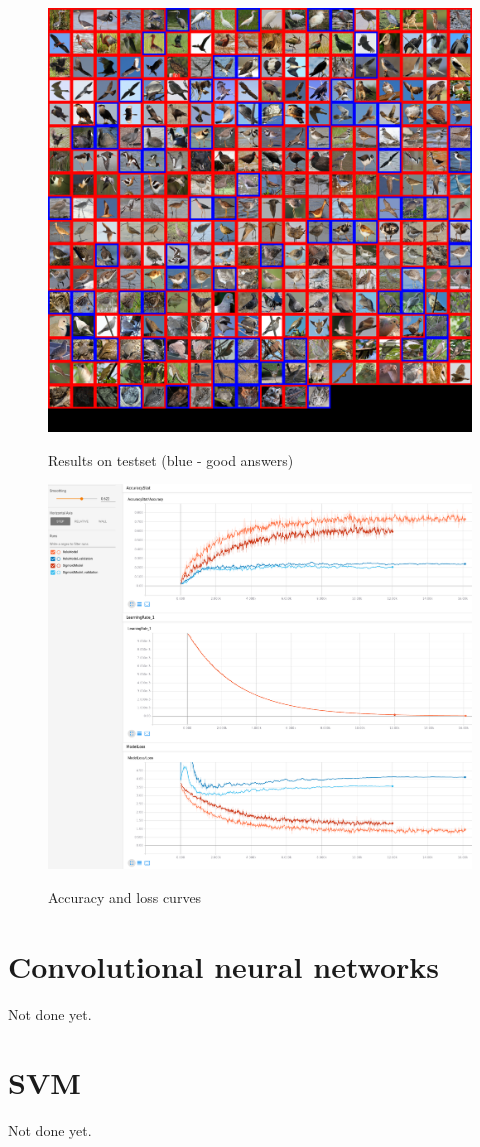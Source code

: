 \documentclass[a4paper]{article}
\begin{document}
\begin{figure}[h]
    \caption[]{Results on testset (blue - good answers)}
    \centering
    \includegraphics[page=2,width=1.0\textwidth]{eval.png}
    \label{fig:eval}
\end{figure}

\begin{figure}[h]
    \caption[]{Accuracy and loss curves}
    \centering
    \includegraphics[page=2,width=1.0\textwidth]{training.png}
    \label{fig:training}
\end{figure}

\section{Convolutional neural networks}
Not done yet.

\section{SVM}
Not done yet.
\end{document}
